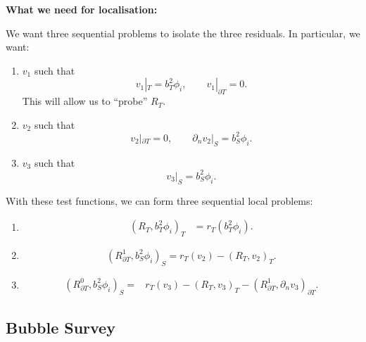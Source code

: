\documentclass[12pt,a4paper]{article}
\newcommand{\dn}{\partial_n}
\newcommand{\Rone}{R_{\partial T}^{1}}
\newcommand{\Rzero}{R_{\partial T}^{0}}
\begin{document}
\textbf{What we need for localisation:}

We want three sequential problems to isolate the three residuals. In particular, we want:
\begin{enumerate}[label=(\arabic*)]
    \item $v_1$ such that
    \begin{equation}
       v_1|_T=b_T^2\phi_i,
       \qquad v_1|_{\partial T}=0.
    \end{equation}
    This will allow us to ``probe'' $R_T$.

    \item $v_2$ such that
    \begin{equation}
        v_2|_{\partial T}=0,
        \qquad \dn v_2|_S=b_S^2\phi_i.
    \end{equation}

    \item $v_3$ such that
    \begin{equation}
        v_3|_S=b_S^2\phi_i.
    \end{equation}
\end{enumerate}

With these test functions, we can form three sequential local problems:
\begin{enumerate}[label=(\arabic*)]
    \item
    \begin{align}
         (R_T,b_T^2\phi_i)_T
           &=r_T(b_T^2\phi_i).
    \end{align}

    \item
    \begin{equation}
        (\Rone,b_S^2\phi_i)_S
        =r_T(v_2)-(R_T,v_2)_T.
    \end{equation}

    \item
    \begin{equation}
    \begin{aligned}
        (\Rzero,b_S^2\phi_i)_S
          ={}&r_T(v_3)-(R_T,v_3)_T
             -(\Rone,\dn v_3)_{\partial T}.
    \end{aligned}
    \end{equation}
\end{enumerate}

\subsection{Bubble Survey}
\end{document}
